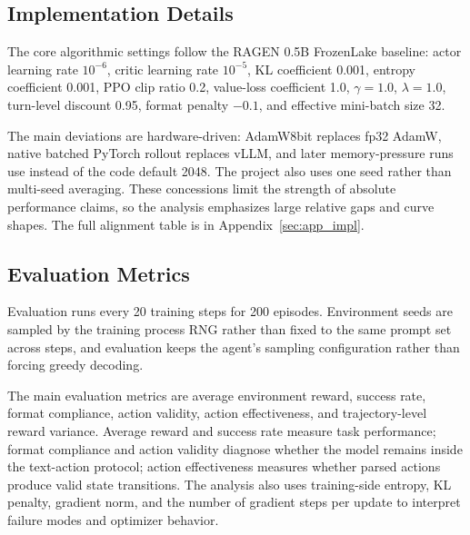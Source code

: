 \subsection{Implementation Details}

The core algorithmic settings follow the RAGEN 0.5B FrozenLake baseline: actor learning rate \(10^{-6}\), critic learning rate \(10^{-5}\), KL coefficient 0.001, entropy coefficient 0.001, PPO clip ratio 0.2, value-loss coefficient 1.0, \(\gamma=1.0\), \(\lambda=1.0\), turn-level discount 0.95, format penalty \(-0.1\), and effective mini-batch size 32.

The main deviations are hardware-driven: AdamW8bit replaces fp32 AdamW, native batched PyTorch rollout replaces vLLM, and later memory-pressure runs use  instead of the code default 2048. The project also uses one seed rather than multi-seed averaging. These concessions limit the strength of absolute performance claims, so the analysis emphasizes large relative gaps and curve shapes. The full alignment table is in Appendix~\ref{sec:app_impl}.

\subsection{Evaluation Metrics}

Evaluation runs every 20 training steps for 200 episodes. Environment seeds are sampled by the training process RNG rather than fixed to the same prompt set across steps, and evaluation keeps the agent's sampling configuration rather than forcing greedy decoding.

The main evaluation metrics are average environment reward, success rate, format compliance, action validity, action effectiveness, and trajectory-level reward variance. Average reward and success rate measure task performance; format compliance and action validity diagnose whether the model remains inside the text-action protocol; action effectiveness measures whether parsed actions produce valid state transitions. The analysis also uses training-side entropy, KL penalty, gradient norm, and the number of gradient steps per update to interpret failure modes and optimizer behavior.
